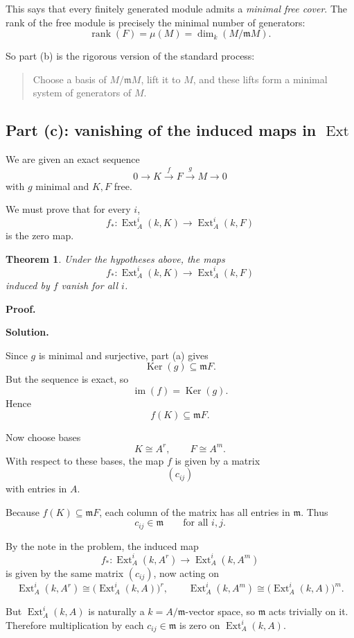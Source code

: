 \documentclass[12pt,a4paper]{article}
\theoremstyle{notespace}
\DeclareMathOperator{\Ker}{Ker}
\DeclareMathOperator{\Ext}{Ext}
\DeclareMathOperator{\im}{im}
\newtheorem{theorem}[definition]{Theorem}
\newcommand{\rank}{\operatorname{rank}}
\newcommand{\m}{\mathfrak m}
\begin{document}
This says that every finitely generated module admits a \emph{minimal free cover}. The rank of the free module is precisely the minimal number of generators:
\[
\rank(F)=\mu(M)=\dim_k(M/\m M).
\]

So part (b) is the rigorous version of the standard process:
\begin{quote}
	Choose a basis of \(M/\m M\), lift it to \(M\), and these lifts form a minimal system of generators of \(M\).
\end{quote}

\subsection{Part (c): vanishing of the induced maps in \(\Ext\)}

We are given an exact sequence
\[
0\longrightarrow K \xrightarrow{\,f\,} F \xrightarrow{\,g\,} M \longrightarrow 0
\]
with \(g\) minimal and \(K,F\) free.

We must prove that for every \(i\),
\[
f_*:\Ext_A^i(k,K)\to \Ext_A^i(k,F)
\]
is the zero map.

\begin{theorem}
	Under the hypotheses above, the maps
	\[
	f_*:\Ext_A^i(k,K)\to \Ext_A^i(k,F)
	\]
	induced by \(f\) vanish for all \(i\).
\end{theorem}

\textbf{Proof.}

\textbf{Solution.}

Since \(g\) is minimal and surjective, part (a) gives
\[
\Ker(g)\subseteq \m F.
\]
But the sequence is exact, so
\[
\im(f)=\Ker(g).
\]
Hence
\[
f(K)\subseteq \m F.
\]

Now choose bases
\[
K\cong A^r,\qquad F\cong A^m.
\]
With respect to these bases, the map \(f\) is given by a matrix
\[
(c_{ij})
\]
with entries in \(A\).

Because \(f(K)\subseteq \m F\), each column of the matrix has all entries in \(\m\). Thus
\[
c_{ij}\in \m
\qquad\text{for all }i,j.
\]

By the note in the problem, the induced map
\[
f_*:\Ext_A^i(k,A^r)\to \Ext_A^i(k,A^m)
\]
is given by the same matrix \((c_{ij})\), now acting on
\[
\Ext_A^i(k,A^r)\cong \bigl(\Ext_A^i(k,A)\bigr)^r,
\qquad
\Ext_A^i(k,A^m)\cong \bigl(\Ext_A^i(k,A)\bigr)^m.
\]

But \(\Ext_A^i(k,A)\) is naturally a \(k=A/\m\)-vector space, so \(\m\) acts trivially on it. Therefore multiplication by each \(c_{ij}\in \m\) is zero on \(\Ext_A^i(k,A)\).
\end{document}

